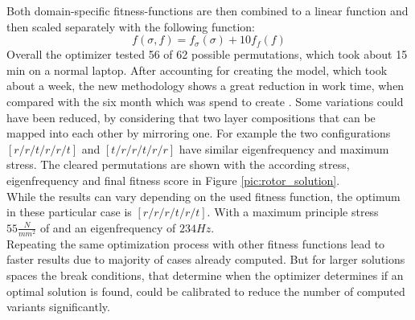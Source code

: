 Both domain-specific fitness-functions are then combined to a linear function 
and then scaled separately with the following function:
\begin{equation}
    \label{eq:fitness_final}
    f(\sigma,f)=f_{\sigma}(\sigma)+10f_{f}(f)
\end{equation}
Overall the optimizer tested 56 of 62 possible permutations, which took about 15 min on a normal laptop.
After accounting for creating the model, which took about a week, the new methodology shows a great reduction in work time, 
when compared with the six month which was spend to create \cite{Filippatos2021}.
Some variations could have been reduced, by considering that two layer compositions that can be mapped into each other by mirroring one.
For example the two configurations $[r/r/t/r/r/t]$ and $[t/r/r/t/r/r]$ have similar eigenfrequency and maximum stress.
The cleared permutations are shown with the according stress, eigenfrequency and final fitness score in Figure \ref{pic:rotor_solution}.\\
While the results can vary depending on the used fitness function, the optimum in these particular case is $[r/r/r/t/r/t]$.
With a maximum principle stress $55 \frac{N}{mm^2}$ of and an eigenfrequency of $234 Hz$.\\ 
Repeating the same optimization process with other fitness functions lead to faster results due to majority of cases already computed.
But for larger solutions spaces the break conditions, 
that determine when the optimizer determines if an optimal solution is found,
could be calibrated to reduce the number of computed variants significantly.